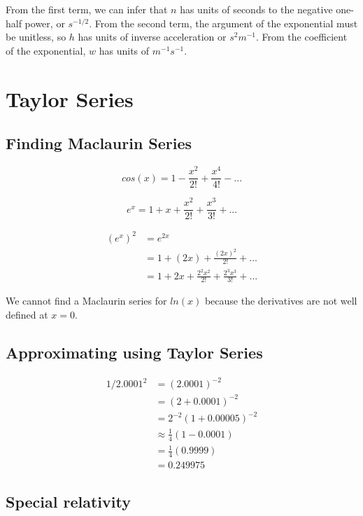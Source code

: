 \documentclass{article}
\begin{document}
From the first term, we can infer that $n$ has units of seconds to the negative one-half power, or $s^{-1/2}$. From the second term, the argument of the exponential must be unitless, so $h$ has units of inverse acceleration or $s^2 m^{-1}$. From the coefficient of the exponential, $w$ has units of $m^{-1}s^{-1}$.

\newpage

\section{Taylor Series}

\subsection{Finding Maclaurin Series}

\begin{equation}
cos(x) = 1 - \frac{x^2}{2!} + \frac{x^4}{4!} - ...
\end{equation}

\begin{equation}
e^x = 1 + x + \frac{x^2}{2!} + \frac{x^3}{3!} + ...
\end{equation}

\begin{align*}
(e^x)^2 &= e^{2x} \\
&= 1 + (2x) + \frac{(2x)^2}{2!} + ... \\
&= 1 + 2x + \frac{2^2x^2}{2!} + \frac{2^3x^3}{3!} + ...
\end{align*}

We cannot find a Maclaurin series for $ln(x)$ because the derivatives are not well defined at $x=0$.

\subsection{Approximating using Taylor Series}

\begin{align*}
1/2.0001^2 &= (2.0001)^{-2} \\
&= (2 + 0.0001)^{-2} \\
&= 2^{-2}(1+0.00005)^{-2} \\
&\approx \frac{1}{4}(1-0.0001) \\
&= \frac{1}{4}(0.9999) \\
&= 0.249975
\end{align*}

\subsection{Special relativity}
\end{document}
